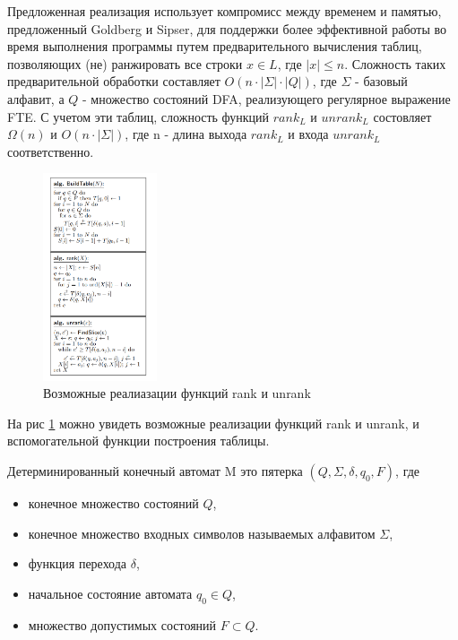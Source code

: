 Предложенная реализация использует компромисс между временем и памятью, предложенный Goldberg и Sipser,
для поддержки более эффективной работы во время выполнения программы путем предварительного вычисления таблиц,
позволяющих (не) ранжировать все строки $x \in L$, где $|x| \leq n$.
Сложность таких предварительной обработки составляет $O(n \cdot |\Sigma| \cdot |Q|)$,
где $\Sigma$ - базовый алфавит, а $Q$ - множество состояний DFA, реализующего регулярное выражение FTE.
С учетом эти таблиц, сложность функций $rank_{L}$ и $unrank_{L}$ состовляет $\Omega(n)$ и $O(n \cdot |\Sigma|)$,
где n - длина выхода $rank_{L}$ и входа $unrank_{L}$ соответственно.

\begin{figure}[h!]
    \begin{center}
        \includegraphics[width = 0.3\textwidth]{algos.png}
        \caption{Возможные реалиазации функций rank и unrank}
        \label{algos}
    \end{center}
\end{figure}

На рис \ref{algos} можно увидеть возможные реализации функций rank и unrank, и вспомогательной функции построения таблицы.

Детерминированный конечный автомат M это пятерка $(Q, \Sigma, \delta, q_0, F)$, где

\begin{itemize}
    \item конечное множество состояний $Q$,
    \item конечное множество входных символов называемых алфавитом $\Sigma$,
    \item функция перехода $\delta$,
    \item начальное состояние автомата $q_0 \in Q$,
    \item множество допустимых состояний $F \subset Q$.
\end{itemize}

